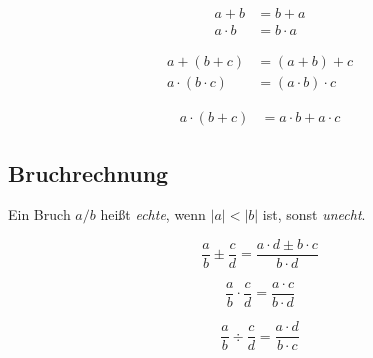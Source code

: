 \begin{shaded}
\begin{equation} \begin{split} a+b&=b+a\\a\cdot b&=b\cdot a \end{split} \end{equation} 
\end{shaded}
\begin{shaded}
 

\begin{equation} \begin{split}a+(b+c) &=(a+b)+c\\a\cdot(b\cdot c)&=(a\cdot b)\cdot c\end{split} \end{equation}
\end{shaded}
 \begin{shaded}
\begin{equation} \begin{split}a\cdot(b+c)&=a\cdot b+a\cdot c\end{split}  \end{equation}
\end{shaded}

\subsection{Bruchrechnung}
Ein Bruch $a/b$ heißt \emph{echte}, wenn $|a|<|b|$ ist, sonst \emph{unecht}.

\begin{shaded}
\begin{equation}
 \frac{a}{b}\pm\frac{c}{d}=\frac{a\cdot d \pm b\cdot c}{b\cdot d}
\end{equation}
\end{shaded}

\begin{shaded}
\begin{equation}
 \frac{a}{b}\cdot\frac{c}{d}=\frac{a\cdot c}{b\cdot d}
\end{equation}
\end{shaded}
\begin{shaded}
\begin{equation}
 \frac{a}{b}\div\frac{c}{d}=\frac{a\cdot d}{b\cdot c}
\end{equation}
\end{shaded}

